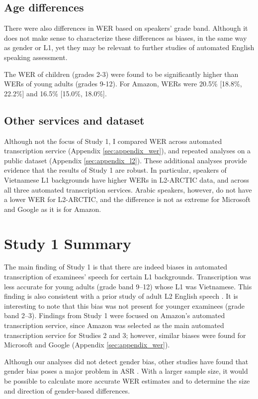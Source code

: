 \documentclass [PhD] {uclathes}
\begin{document}
\subsection{Age differences}

There were also differences in WER based on speakers' grade band. Although it does not make sense to characterize these differences as biases, in the same way as gender or L1, yet they may be relevant to further studies of automated English speaking assessment.

The WER of children (grades 2-3) were found to be significantly higher than WERs of young adults (grades 9-12). For Amazon, WERs were 20.5\% [18.8\%, 22.2\%] and 16.5\% [15.0\%, 18.0\%].

\subsection{Other services and dataset}

Although not the focus of Study 1, I compared WER across automated transcription service (Appendix \ref{sec:appendix_wer}), and repeated analyses on a public dataset (Appendix \ref{sec:appendix_l2}). These additional analyses provide evidence that the results of Study 1 are robust. In particular, speakers of Vietnamese L1 backgrounds have higher WERs in L2-ARCTIC data, and across all three automated transcription services. Arabic speakers, however, do not have a lower WER for L2-ARCTIC, and the difference is not as extreme for Microsoft and Google as it is for Amazon. 

\section{Study 1 Summary}

The main finding of Study 1 is that there are indeed biases in automated transcription of examinees’ speech for certain L1 backgrounds. Transcription was less accurate for young adults (grade band 9–12) whose L1 was Vietnamese. This finding is also consistent with a prior study of adult L2 English speech \citep{chan2022training}. It is interesting to note that this bias was not present for younger examinees (grade band 2–3). Findings from Study 1 were focused on Amazon’s automated transcription service, since Amazon was selected as the main automated transcription service for Studies 2 and 3; however, similar biases were found for Microsoft and Google (Appendix \ref{sec:appendix_wer}). 

Although our analyses did not detect gender bias, other studies have found that gender bias poses a major problem in ASR \citep{hutiri2022}. With a larger sample size, it would be possible to calculate more accurate WER estimates and to determine the size and direction of gender-based differences. 
\end{document}
